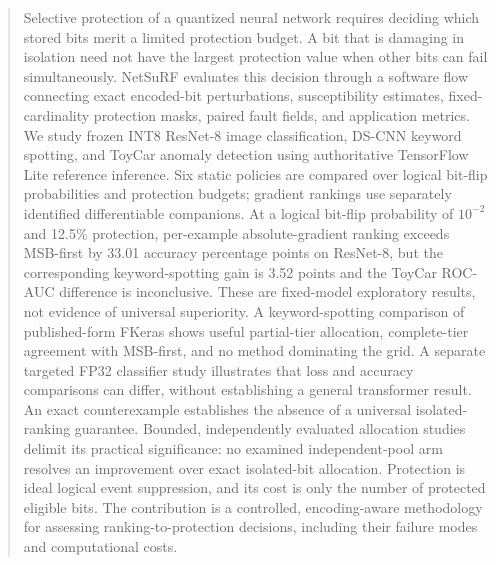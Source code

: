 \documentclass[manuscript,screen,review]{acmart}
\begin{document}
\begin{abstract}
Selective protection of a quantized neural network requires deciding which stored bits merit a limited protection budget. A bit that is damaging in isolation need not have the largest protection value when other bits can fail simultaneously. NetSuRF evaluates this decision through a software flow connecting exact encoded-bit perturbations, susceptibility estimates, fixed-cardinality protection masks, paired fault fields, and application metrics. We study frozen INT8 ResNet-8 image classification, DS-CNN keyword spotting, and ToyCar anomaly detection using authoritative TensorFlow Lite reference inference. Six static policies are compared over logical bit-flip probabilities and protection budgets; gradient rankings use separately identified differentiable companions. At a logical bit-flip probability of $10^{-2}$ and 12.5\% protection, per-example absolute-gradient ranking exceeds MSB-first by 33.01 accuracy percentage points on ResNet-8, but the corresponding keyword-spotting gain is 3.52 points and the ToyCar ROC-AUC difference is inconclusive. These are fixed-model exploratory results, not evidence of universal superiority. A keyword-spotting comparison of published-form FKeras shows useful partial-tier allocation, complete-tier agreement with MSB-first, and no method dominating the grid. A separate targeted FP32 classifier study illustrates that loss and accuracy comparisons can differ, without establishing a general transformer result. An exact counterexample establishes the absence of a universal isolated-ranking guarantee. Bounded, independently evaluated allocation studies delimit its practical significance: no examined independent-pool arm resolves an improvement over exact isolated-bit allocation. Protection is ideal logical event suppression, and its cost is only the number of protected eligible bits. The contribution is a controlled, encoding-aware methodology for assessing ranking-to-protection decisions, including their failure modes and computational costs.
\end{abstract}
\maketitle










\appendix



\end{document}
